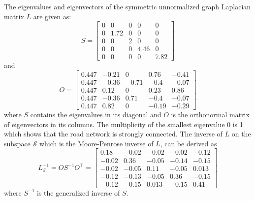 \documentclass[b5paper,12pt]{report}
\theoremstyle{definition}
\begin{document}
The eigenvalues and eigenvectors of the symmetric unnormalized graph Laplacian matrix $L$ are given as:
\begin{equation*}
    S = \begin{bmatrix} 0 & 0 & 0 & 0 & 0 \\ 
    0 & 1.72 &0&0&0 \\ 0&0&  2 &0&0 \\ 
    0&0&0&  4.46 &0\\
    0&0&0&0&7.82 \end{bmatrix}
\end{equation*} 
and
\begin{equation*}
    O = \begin{bmatrix} 0.447 & -0.21 & 0 &  0.76 &  -0.41 \\
    0.447 & -0.36 &  -0.71 &   -0.4 & -0.07 \\
    0.447 &  0.12 &   0 & 0.23 & 0.86 \\
    0.447 &  -0.36 &  0.71 &   -0.4 & -0.07 \\
    0.447 & 0.82 &  0 &  -0.19 & -0.29 \end{bmatrix}
\end{equation*}
where $S$ contains the eigenvalues in its diagonal and $O$ is the orthonormal matrix of eigenvectors in its columns. The multiplicity of the smallest eigenvalue 0 is 1 which shows that the road network is strongly connected. The inverse of $L$ on the subspace $\mathcal{S}$ which is the Moore-Penrose inverse of $L$, can be derived as
\[
    L_{\mathcal{S}}^{-1} = O S^{-1} O^\top = \begin{bmatrix}  
    0.18 &  -0.02 & -0.02 & -0.02 & -0.12 \\
    -0.02 &  0.36 & -0.05 & -0.14 & -0.15 \\
    -0.02 & -0.05 &  0.11 & -0.05 & 0.013 \\
     -0.12 & -0.13 & -0.05 & 0.36 & -0.15 \\
    -0.12 & -0.15 & 0.013 & -0.15 &  0.41 \end{bmatrix}
\]
where $S^{-1}$ is the generalized inverse of $S$.
\end{document}
